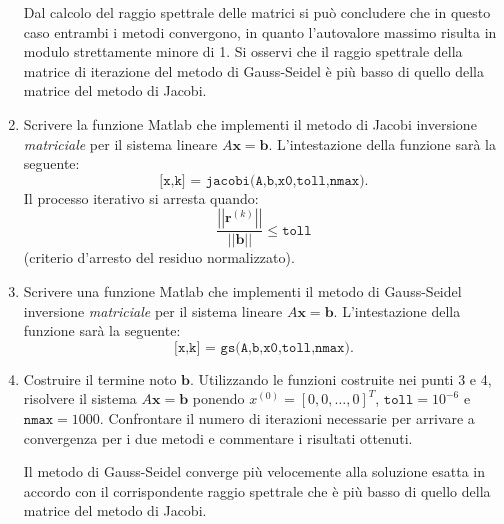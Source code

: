 \begin{enumerate}
    Dal calcolo del raggio spettrale delle matrici si può concludere che in questo caso entrambi i metodi convergono, in quanto l'autovalore massimo risulta in modulo strettamente minore di 1. Si osservi che il raggio spettrale della matrice di iterazione del metodo di Gauss-Seidel è più basso di quello della matrice del metodo di Jacobi.

    \item Scrivere la funzione Matlab che implementi il metodo di Jacobi inversione \emph{matriciale} per il sistema lineare $A\mathbf{x} = \mathbf{b}$. L'intestazione della funzione sarà la seguente:
    \begin{equation*}
        \texttt{[x,k] = jacobi(A,b,x0,toll,nmax).}
    \end{equation*}
    Il processo iterativo si arresta quando:
    \begin{equation*}
        \dfrac{\left|\left|\mathbf{r}^{(k)}\right|\right|}{\left|\left|\mathbf{b}\right|\right|} \leq \texttt{toll}
    \end{equation*}
    (criterio d'arresto del residuo normalizzato).

    

    \item Scrivere una funzione Matlab che implementi il metodo di Gauss-Seidel inversione \emph{matriciale} per il sistema lineare $A\mathbf{x} = \mathbf{b}$. L'intestazione della funzione sarà la seguente:
    \begin{equation*}
        \texttt{[x,k] = gs(A,b,x0,toll,nmax).}
    \end{equation*}

    

    \item Costruire il termine noto $\mathbf{b}$. Utilizzando le funzioni costruite nei punti 3 e 4, risolvere il sistema $A\mathbf{x} = \mathbf{b}$ ponendo $x^{(0)} = \left[0,0,\dots,0\right]^{T}$, $\texttt{toll} = 10^{-6}$ e $\texttt{nmax} = 1000$. Confrontare il numero di iterazioni necessarie per arrivare a convergenza per i due metodi e commentare i risultati ottenuti.
    
    Il metodo di Gauss-Seidel converge più velocemente alla soluzione esatta in accordo con il corrispondente raggio spettrale che è più basso di quello della matrice del metodo di Jacobi.
    
\end{enumerate}
